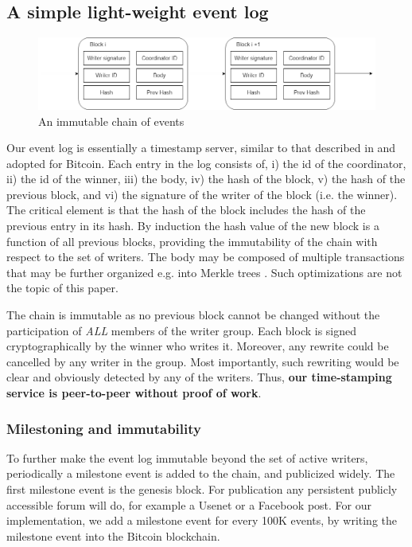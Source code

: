 \documentclass[10pt]{article}
\begin{document}
\subsection{A simple light-weight event log}

\begin{figure}
    \centering
    \includegraphics[scale=0.4]{images/chain.png}
    \caption{An immutable chain of events}
    \label{fig:my_label}
\end{figure}

Our event log is essentially a timestamp server, similar to that described in \cite{massias} and adopted for Bitcoin. Each entry in the log consists of, i) the id of the coordinator, ii) the id of the winner, iii) the body, iv) the hash of the block, v) the hash of the previous block, and vi) the signature of the writer of the block (i.e. the winner).
The critical element is that the hash of the block includes the hash of the previous entry in its hash. By induction the hash value of the new block is a function of all previous blocks, providing the immutability of the chain with respect to the set of writers. The body may be composed of multiple transactions that may be further organized e.g. into Merkle trees \cite{Mercle1980}.
Such optimizations are not the topic of this paper.

The chain is immutable as no previous block cannot be changed without the participation of \emph{ALL} members of the writer group. Each block is signed cryptographically by the winner who writes it. Moreover, any rewrite could be cancelled by any writer in the group. Most importantly, such rewriting would be clear and obviously detected by any of the writers. Thus, %
\textbf{our time-stamping service is peer-to-peer without proof of work}. 


\subsubsection*{Milestoning and immutability}
To further make the event log immutable beyond the set of active writers, periodically a milestone event is added to the chain, and publicized widely. The first milestone event is the genesis block. For publication any persistent publicly accessible forum will do, for example a Usenet or a Facebook post. For our implementation, we add a milestone event for every 100K events, by writing the milestone event into the Bitcoin blockchain. 
\end{document}

